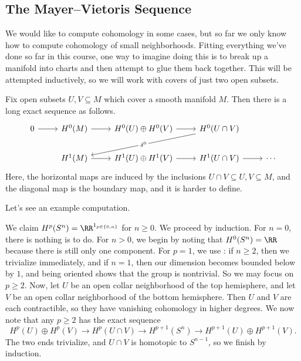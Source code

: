 \documentclass[../notes.tex]{subfiles}
\begin{document}
\subsection{The Mayer--Vietoris Sequence}
We would like to compute cohomology in some cases, but so far we only know how to compute cohomology of small neighborhoods. Fitting everything we've done so far in this course, one way to imagine doing this is to break up a manifold into charts and then attempt to glue them back together. This will be attempted inductively, so we will work with covers of just two open subsets.
\begin{theorem}
	Fix open subsets $U,V\subseteq M$ which cover a smooth manifold $M$. Then there is a long exact sequence as follows.
	\[\begin{tikzcd}
		0 & {H^0(M)} & {H^0(U)\oplus H^0(V)} & {H^0(U\cap V)} \\
		& {H^1(M)} & {H^1(U)\oplus H^1(V)} & {H^1(U\cap V)} & \cdots
		\arrow[from=1-1, to=1-2]
		\arrow[from=1-2, to=1-3]
		\arrow[from=1-3, to=1-4]
		\arrow["{\delta^0}"{description}, from=1-4, to=2-2]
		\arrow[from=2-2, to=2-3]
		\arrow[from=2-3, to=2-4]
		\arrow[from=2-4, to=2-5]
	\end{tikzcd}\]
	Here, the horizontal maps are induced by the inclusions $U\cap V\subseteq U,V\subseteq M$, and the diagonal map is the boundary map, and it is harder to define.
\end{theorem}
Let's see an example computation.
\begin{example}
	We claim $H^p(S^n)=\RR^{1_{p\in\{0,n\}}}$ for $n\ge0$. We proceed by induction. For $n=0$, there is nothing is to do. For $n>0$, we begin by noting that $H^0(S^n)=\RR$ because there is still only one component. For $p=1$, we use : if $n\ge2$, then we trivialize immediately, and if $n=1$, then our dimension becomes bounded below by $1$, and being oriented shows that the group is nontrivial. So we may focus on $p\ge2$. Now, let $U$ be an open collar neighborhood of the top hemisphere, and let $V$ be an open collar neighborhood of the bottom hemisphere. Then $U$ and $V$ are each contractible, so they have vanishing cohomology in higher degrees. We now note that any $p\ge2$ has the exact sequence
	\[H^p(U)\oplus H^p(V)\to H^p(U\cap V)\to H^{p+1}(S^n)\to H^{p+1}(U)\oplus H^{p+1}(V).\]
	The two ends trivialize, and $U\cap V$ is homotopic to $S^{n-1}$, so we finish by induction.
\end{example}
\end{document}
